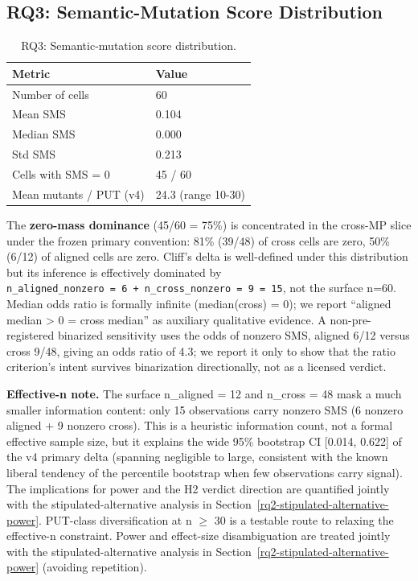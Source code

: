 \documentclass[manuscript,screen,review]{acmart}
\begin{document}
\subsection{RQ3: Semantic-Mutation Score Distribution}\label{rq1-60-cell-distribution}

{%
\begin{longtable}[]{@{}ll@{}}
\caption{RQ3: Semantic-mutation score distribution.}\\
\toprule\noalign{}
Metric & Value \\
\midrule\noalign{}
\endhead
\bottomrule\noalign{}
\endlastfoot
Number of cells & 60 \\
Mean SMS & 0.104 \\
Median SMS & 0.000 \\
Std SMS & 0.213 \\
Cells with SMS = 0 & 45 / 60 \\
Mean mutants / PUT (v4) & 24.3 (range 10-30) \\
\end{longtable}
}

The \textbf{zero-mass dominance} (45/60 = 75\%) is concentrated in the
cross-MP slice under the frozen primary convention: 81\% (39/48) of
cross cells are zero,
50\% (6/12) of aligned cells are zero. Cliff's delta is
well-defined under this distribution but its inference is effectively
dominated by
\texttt{n\_aligned\_nonzero\ =\ 6\ +\ n\_cross\_nonzero\ =\ 9\ =\ 15}, not the
surface n=60. Median odds ratio is formally infinite (median(cross) =
0); we report ``aligned median \textgreater{} 0 = cross median'' as
auxiliary qualitative evidence. A non-pre-registered binarized
sensitivity uses the odds of nonzero SMS, aligned 6/12 versus cross
9/48, giving an odds ratio of 4.3; we report it only to show that the
ratio criterion's intent survives binarization directionally, not as a
licensed verdict.

\textbf{Effective-n note.} The surface n\_aligned = 12 and n\_cross = 48
mask a much smaller information content: only 15 observations carry
nonzero SMS (6 nonzero aligned + 9 nonzero cross). This is a heuristic
information count, not a formal effective sample size, but it explains the
wide 95\% bootstrap CI {[}0.014, 0.622{]} of the v4 primary delta
(spanning negligible to large, consistent with the known liberal tendency of the percentile
bootstrap when few observations carry signal). The implications for power and the H2 verdict direction are
quantified jointly with the stipulated-alternative analysis in Section~\ref{rq2-stipulated-alternative-power}.
PUT-class diversification at n $\geq$ 30 is a testable route to relaxing
the effective-n constraint. Power and effect-size disambiguation are
treated jointly with the stipulated-alternative analysis in Section~\ref{rq2-stipulated-alternative-power}
(avoiding repetition).
\end{document}
